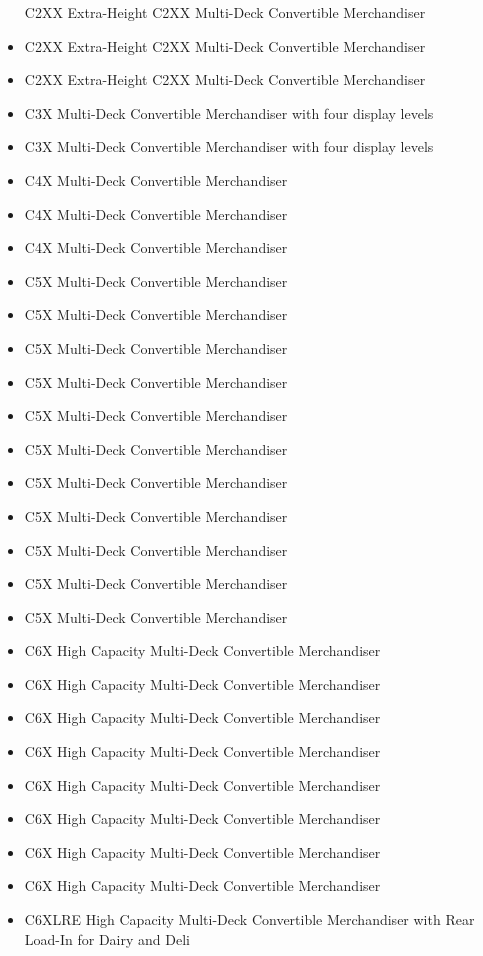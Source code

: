 \begin{itemize}
  C2XX Extra-Height C2XX Multi-Deck Convertible Merchandiser
\item
  C2XX Extra-Height C2XX Multi-Deck Convertible Merchandiser
\item
  C2XX Extra-Height C2XX Multi-Deck Convertible Merchandiser
\item
  C3X Multi-Deck Convertible Merchandiser with four display levels
\item
  C3X Multi-Deck Convertible Merchandiser with four display levels
\item
  C4X Multi-Deck Convertible Merchandiser
\item
  C4X Multi-Deck Convertible Merchandiser
\item
  C4X Multi-Deck Convertible Merchandiser
\item
  C5X Multi-Deck Convertible Merchandiser
\item
  C5X Multi-Deck Convertible Merchandiser
\item
  C5X Multi-Deck Convertible Merchandiser
\item
  C5X Multi-Deck Convertible Merchandiser
\item
  C5X Multi-Deck Convertible Merchandiser
\item
  C5X Multi-Deck Convertible Merchandiser
\item
  C5X Multi-Deck Convertible Merchandiser
\item
  C5X Multi-Deck Convertible Merchandiser
\item
  C5X Multi-Deck Convertible Merchandiser
\item
  C5X Multi-Deck Convertible Merchandiser
\item
  C5X Multi-Deck Convertible Merchandiser
\item
  C6X High Capacity Multi-Deck Convertible Merchandiser
\item
  C6X High Capacity Multi-Deck Convertible Merchandiser
\item
  C6X High Capacity Multi-Deck Convertible Merchandiser
\item
  C6X High Capacity Multi-Deck Convertible Merchandiser
\item
  C6X High Capacity Multi-Deck Convertible Merchandiser
\item
  C6X High Capacity Multi-Deck Convertible Merchandiser
\item
  C6X High Capacity Multi-Deck Convertible Merchandiser
\item
  C6X High Capacity Multi-Deck Convertible Merchandiser
\item
  C6XLRE High Capacity Multi-Deck Convertible Merchandiser with Rear Load-In for Dairy and Deli

\end{itemize}
